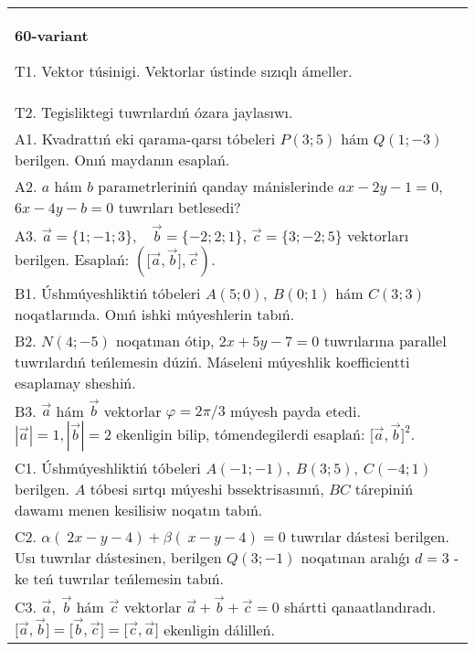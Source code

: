 \documentclass{article}
\begin{document}
    
    \begin{tabular}{m{17cm}}
    \textbf{60-variant}
    \newline
    
    T1. 
    Vektor túsinigi. Vektorlar ústinde sızıqlı ámeller.
     \\
    T2. 
    Tegisliktegi tuwrılardıń ózara jaylasıwı.
     \\
    A1. 
    Kvadrattıń eki qarama-qarsı tóbeleri $P(3; 5)$ hám
    $Q(1; -3)$ berilgen. Onıń maydanın esaplań.
     \\
    A2. 
    $a$ hám $b$ parametrleriniń qanday mánislerinde
    $ax-2y-1=0$, $6x-4y-b=0$ tuwrıları betlesedi?
     \\
    A3. 
    $\overrightarrow{a}
    = \{ 1; - 1;3\}, \ \ \ \ \overrightarrow{b} = \{ - 2;2;1\}$, $\overrightarrow{c} = \{3; -2;5\}$ vektorları berilgen. Esaplań: 
    $(\lbrack\overrightarrow{a},\overrightarrow{b}\rbrack,\overrightarrow{c})$.
     \\
    B1. 
    Úshmúyeshliktiń tóbeleri \(A(5;0),\ B(0;1)\) hám \(C(3;3)\)
    noqatlarında. Onıń ishki múyeshlerin tabıń.
     \\
    B2. 
    \(N(4;-5)\) noqatınan ótip, $2x+5y-7=0$ 
    tuwrılarına parallel tuwrılardıń teńlemesin dúziń. Máseleni múyeshlik
    koefficientti esaplamay sheshiń.
     \\
    B3. 
    $\vec{a}$ hám $\vec{b}$ vektorlar $\varphi = 2\pi/3$ múyesh payda etedi. $|\vec{a}| = 1,|\vec{b}| = 2$ ekenligin bilip, tómendegilerdi esaplań: 
    $\lbrack\vec{a},\vec{b}\rbrack^{2}$.
     \\
    C1. 
    Úshmúyeshliktiń tóbeleri
    \(A( - 1; - 1),\ B(3;5),\ C( - 4;1)\) berilgen. $A$ tóbesi sırtqı
    múyeshi bssektrisasınıń, $BC$ tárepiniń dawamı menen kesilisiw
    noqatın tabıń.
     \\
    C2. 
    \(\alpha (\ 2x - y - 4) + \beta(\ x - y - 4) = 0\) 
    tuwrılar dástesi berilgen. Usı tuwrılar dástesinen, berilgen
    \(Q(3; - 1)\) noqatınan aralıǵı \(d = 3\) -ke teń tuwrılar teńlemesin
    tabıń.
     \\
    C3. 
    \(\vec{a},\ \vec{b}\) hám \(\vec{c}\) vektorlar \(\vec{a} + \vec{b} + \vec{c} = 0\) shártti qanaatlandıradı. \(\lbrack\vec{a},\vec{b}\rbrack = \lbrack\vec{b},\vec{c}\rbrack = \lbrack\vec{c},\vec{a}\rbrack\) ekenligin dálilleń.
     \\
    
    \end{tabular}
    \vspace{1cm}
\end{document}
